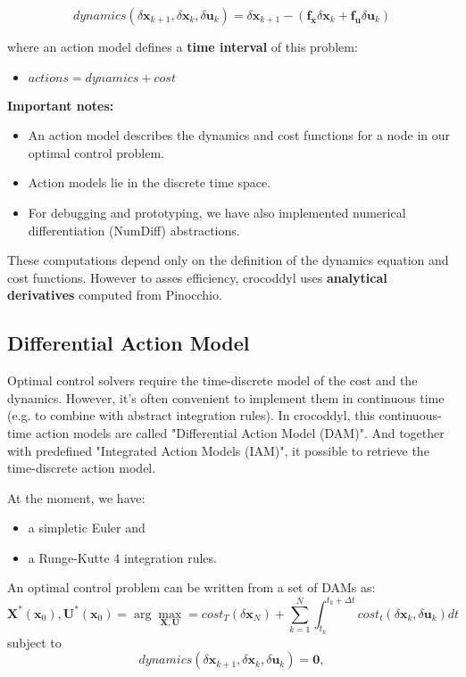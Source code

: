 $$
dynamics(\delta\mathbf{x}_{k+1},\delta\mathbf{x}_k,\delta\mathbf{u}_k) = \delta\mathbf{x}_{k+1} - (\mathbf{f_x}\delta\mathbf{x}_k + \mathbf{f_u}\delta\mathbf{u}_k)
$$

where an action model defines a \textbf{time interval} of this problem:
\begin{itemize}
\item $actions = dynamics + cost$
\end{itemize}

\textbf{Important notes:}
\begin{itemize}
\item An action model describes the dynamics and cost functions for a node in our optimal control problem.
\item Action models lie in the discrete time space.
\item For debugging and prototyping, we have also implemented numerical differentiation (NumDiff) abstractions.
\end{itemize}
 These computations depend only on the definition of the dynamics equation and cost functions. However to asses efficiency, crocoddyl uses \textbf{analytical derivatives} computed from Pinocchio.
 
\subsection{Differential Action Model}
Optimal control solvers require the time-discrete model of the cost and the dynamics. However, it's often convenient to implement them in continuous time (e.g. to combine with abstract integration rules). In crocoddyl, this continuous-time action models are called "Differential Action Model (DAM)". And together with predefined "Integrated Action Models (IAM)", it possible to retrieve the time-discrete action model.

At the moment, we have:
\begin{itemize}
\item a simpletic Euler and
\item a Runge-Kutte 4 integration rules.
\end{itemize}

An optimal control problem can be written from a set of DAMs as:
$$\mathbf{X}^*(\mathbf{x}_0),\mathbf{U}^*(\mathbf{x}_0)
=
\arg\max_{\mathbf{X},\mathbf{U}} = cost_T(\delta\mathbf{x}_N) + \sum_{k=1}^N \int_{t_k}^{t_k+\Delta t} cost_t(\delta\mathbf{x}_k, \delta\mathbf{u}_k) dt$$
subject to
$$dynamics(\delta\mathbf{x}_{k+1},\delta\mathbf{x}_k,\delta\mathbf{u}_k)=\mathbf{0},$$

